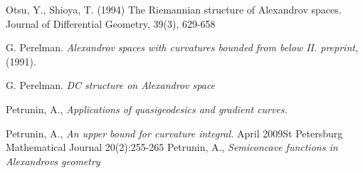 \begin{thebibliography}{52}
   Otsu, Y.,  Shioya, T. (1994)
The Riemannian structure of Alexandrov spaces. Journal of Differential Geometry, 39(3), 629-658

 G. Perelman. \textit{Alexandrov spaces with curvatures bounded from below II. preprint}, (1991).

 G. Perelman. \textit{DC structure on Alexandrov space}

 Petrunin, A., \textit{Applications of quasigeodesics
and gradient curves.}

 Petrunin, A., \textit{An upper bound for curvature integral.} April 2009St Petersburg Mathematical Journal 20(2):255-265
 Petrunin, A., \textit{Semiconcave functions in Alexandrovs geometry}

\end{thebibliography}
